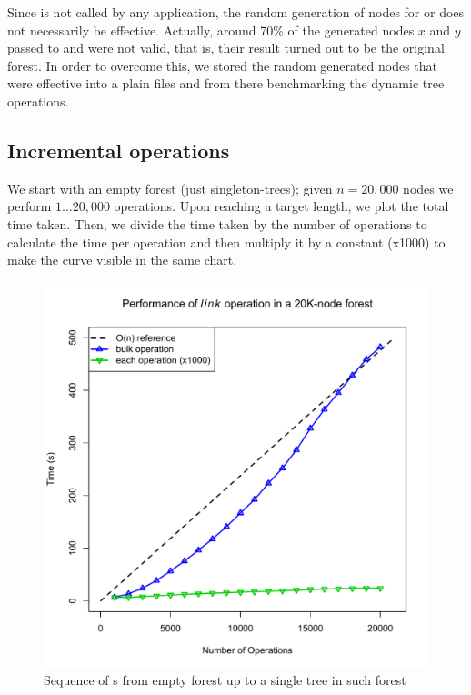 Since \dyntset is not called by any application, the random generation of nodes for \link or \cut does not necessarily be effective. Actually, around 70\% of the generated nodes $x$ and $y$ passed to \link and \cut were not valid, that is, their result turned out to be the original forest. In order to overcome this, we stored the random generated nodes that were effective into a plain files and from there benchmarking the dynamic tree operations.


\subsection{Incremental operations} 
We start with an empty forest (just singleton-trees); given $n=20,000$ nodes we perform $1 \ldots 20,000$ \link operations. Upon reaching a target length, we plot the total time taken. Then, we divide the time taken by the number of operations to calculate the time per operation and then multiply it by a constant (x1000) to make the curve visible in the same chart.

\begin{figure}[H]
\begin{center}
\includegraphics[scale=0.4]{./Images/plotLink} 
\end{center}
\caption{Sequence of {\link}s from empty forest up to a single tree in such forest}
\label{fig:incLink}
\end{figure}

